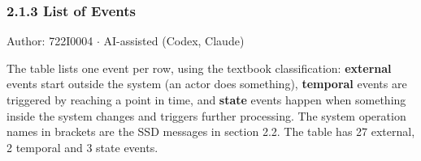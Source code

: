 \subsubsection*{2.1.3 List of Events}
Author: 722I0004 \ensuremath{\cdot} AI-assisted (Codex, Claude)

The table lists one event per row, using the textbook classification: \textbf{external} events start outside the system (an actor does something), \textbf{temporal} events are triggered by reaching a point in time, and \textbf{state} events happen when something inside the system changes and triggers further processing. The system operation names in brackets are the SSD messages in section 2.2. The table has 27 external, 2 temporal and 3 state events.

